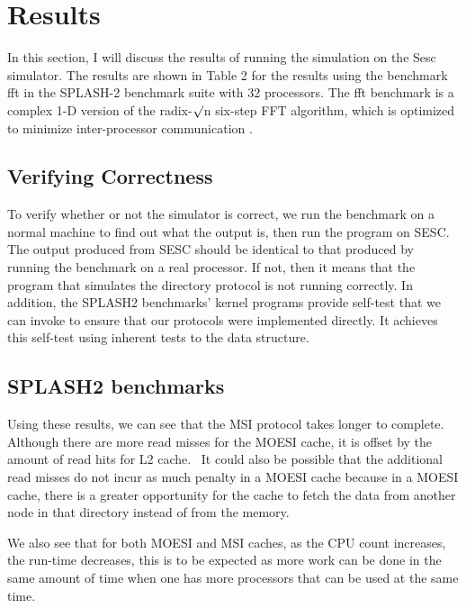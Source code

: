 \documentclass[letterpaper]{article}
\begin{document}
\section[Results]{\rmfamily Results}
In this section, I will discuss the results of running the simulation on the Sesc simulator. The results are shown in Table 2 for the results using the benchmark fft in the SPLASH-2 benchmark suite with 32 processors. The fft benchmark is a complex 1-D version of the radix-${\surd}$n six-step FFT algorithm, which is optimized to minimize inter-processor communication \cite{WOO00}.

\subsection[Verifying Correctness]{\rmfamily Verifying Correctness}
To verify whether or not the simulator is correct, we run the benchmark on a normal machine to find out what the output is, then run the program on SESC. The output produced from SESC should be identical to that produced by running the benchmark on a real processor. If not, then it means that the program that simulates the directory protocol is not running correctly. In addition, the SPLASH2 benchmarks' kernel programs provide self-test that we can invoke to ensure that our protocols were implemented directly. It achieves this self-test using inherent tests to the data structure.

\subsection[SPLASH2 benchmarks]{\rmfamily SPLASH2 benchmarks}
Using these results, we can see that the MSI protocol takes longer to complete. Although there are more read misses for the MOESI cache, it is offset by the amount of read hits for L2 cache. \ It could also be possible that the additional read misses do not incur as much penalty in a MOESI cache because in a MOESI cache, there is a greater opportunity for the cache to fetch the data from another node in that directory instead of from the memory.

{\ttfamily
\textrm{We also see that for both MOESI and MSI caches, as the CPU count increases, the run-time decreases, this is to be expected as more work can be done in the same amount of time when one has more processors that can be used at the same time.}}
\end{document}
